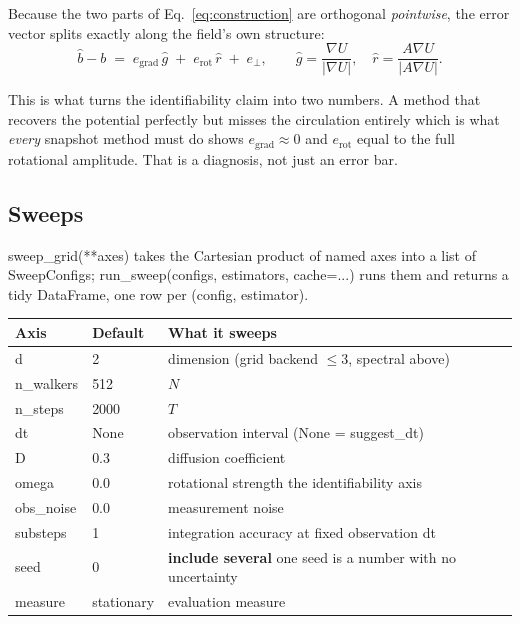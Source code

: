 \documentclass[11pt,a4paper]{article}
\newcommand{\code}[1]{{\ttfamily\small #1}}
\begin{document}
Because the two parts of Eq.~\eqref{eq:construction} are orthogonal \emph{pointwise},
the error vector splits exactly along the field's own structure:
\[
  \hat b - b \;=\; e_{\mathrm{grad}}\,\hat g \;+\; e_{\mathrm{rot}}\,\hat r \;+\; e_\perp ,
  \qquad
  \hat g = \frac{\nabla U}{|\nabla U|},\quad
  \hat r = \frac{A\nabla U}{|A\nabla U|} .
\]

This is what turns the identifiability claim into two numbers. A method that recovers
the potential perfectly but misses the circulation entirely \textemdash{} which is what
\emph{every} snapshot method must do \textemdash{} shows $e_{\mathrm{grad}}\approx0$ and
$e_{\mathrm{rot}}$ equal to the full rotational amplitude. That is a diagnosis, not just
an error bar.

\subsection{Sweeps}

\code{sweep\_grid(**axes)} takes the Cartesian product of named axes into a list of
\code{SweepConfig}s; \code{run\_sweep(configs, estimators, cache=...)} runs them and
returns a tidy \code{DataFrame}, one row per (config, estimator).

\begin{center}
\begin{tabular}{@{}L{0.20\textwidth} L{0.10\textwidth} L{0.62\textwidth}@{}}
\toprule
\textbf{Axis} & \textbf{Default} & \textbf{What it sweeps} \\
\midrule
\code{d}          & 2     & dimension (grid backend $\le3$, spectral above) \\
\code{n\_walkers} & 512   & $N$ \\
\code{n\_steps}   & 2000  & $T$ \\
\code{dt}         & None  & observation interval (\code{None} = \code{suggest\_dt}) \\
\code{D}          & 0.3   & diffusion coefficient \\
\code{omega}      & 0.0   & rotational strength \textemdash{} the identifiability axis \\
\code{obs\_noise} & 0.0   & measurement noise \\
\code{substeps}   & 1     & integration accuracy at fixed observation \code{dt} \\
\code{seed}       & 0     & \textbf{include several} \textemdash{} one seed is a number with no uncertainty \\
\code{measure}    & stationary & evaluation measure \\
\bottomrule
\end{tabular}
\end{center}
\end{document}
